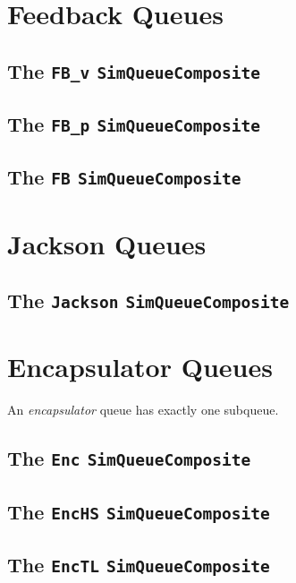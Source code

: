 \documentclass[12pt]{book}
\begin{document}
\section{Feedback Queues}

\subsection{The \lstinline{FB_v} \lstinline{SimQueueComposite}}
\label{sec:FB_v}

\subsection{The \lstinline{FB_p} \lstinline{SimQueueComposite}}
\label{sec:FB_p}

\subsection{The \lstinline{FB} \lstinline{SimQueueComposite}}
\label{sec:FB}

\section{Jackson Queues}

\subsection{The \lstinline{Jackson} \lstinline{SimQueueComposite}}
\label{sec:Jackson}

\section{Encapsulator Queues}

An {\em encapsulator\/} queue has exactly one subqueue.

\subsection{The \lstinline{Enc} \lstinline{SimQueueComposite}}
\label{sec:Enc}

\subsection{The \lstinline{EncHS} \lstinline{SimQueueComposite}}
\label{sec:EncHS}

\subsection{The \lstinline{EncTL} \lstinline{SimQueueComposite}}
\label{sec:EncTL}
\end{document}

